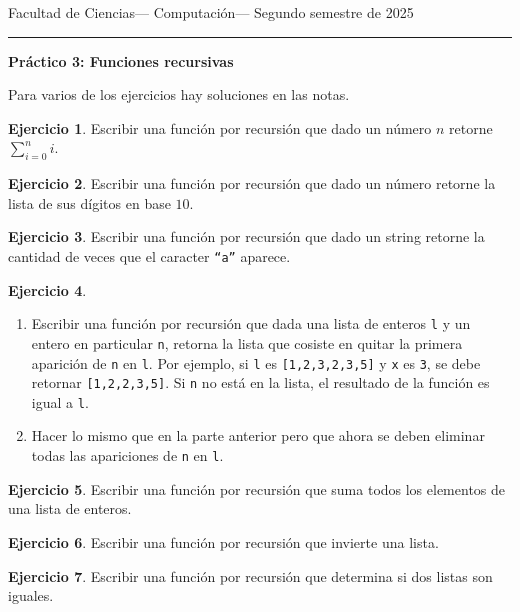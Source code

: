 \documentclass[a4paper,12pt]{book}
\theoremstyle{definition}
\newtheorem{ejercicio}{Ejercicio}
\begin{document}
	
	\noindent
	\centerline{\sc
		Facultad de Ciencias\hfill---\hfill
		Computación\hfill---\hfill
		Segundo semestre de 2025}\smallbreak\hrule
	
	\bigbreak
	\centerline{\Large\textbf{Práctico 3: Funciones recursivas}}
	\bigbreak
	
	Para varios de los ejercicios hay soluciones en las notas.
	
	\begin{ejercicio}
		Escribir una función por recursión que dado un número $n$ retorne $\sum_{i=0}^ni$.
	\end{ejercicio}
	
	\begin{ejercicio}
		Escribir una función por recursión que dado un número retorne la lista de sus dígitos en base $10$.
	\end{ejercicio}
	
	\begin{ejercicio}
		Escribir una función por recursión que dado un string retorne la cantidad de veces que el caracter {\tt``a''} aparece.
	\end{ejercicio}
	
	\begin{ejercicio}
		\begin{enumerate}\parskip-.5ex
			\item Escribir una función por recursión que dada una lista de enteros {\tt l} y un entero en particular {\tt n}, retorna la lista que cosiste en quitar la primera aparición de {\tt n} en {\tt l}. Por ejemplo, si {\tt l} es {\tt[1,2,3,2,3,5]} y {\tt x} es {\tt 3}, se debe retornar {\tt[1,2,2,3,5]}. Si {\tt n} no está en la lista, el resultado de la función es igual a {\tt l}.
			\item Hacer lo mismo que en la parte anterior pero que ahora se deben eliminar todas las apariciones de {\tt n} en {\tt l}.
		\end{enumerate}
	\end{ejercicio}
	
	\begin{ejercicio}
		Escribir una función por recursión que suma todos los elementos de una lista de enteros.
	\end{ejercicio}
	
	\begin{ejercicio}
		Escribir una función por recursión que invierte una lista.
	\end{ejercicio}

	
	\begin{ejercicio}
		Escribir una función por recursión que determina si dos listas son iguales.
	\end{ejercicio}
	
\end{document}
